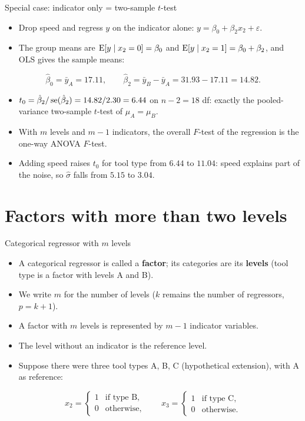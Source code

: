 \begin{frame}{Special case: indicator only = two-sample $t$-test}
    \begin{itemize}
        \item Drop speed and regress $y$ on the indicator alone: $y = \beta_0 + \beta_2 x_2 + \varepsilon$.
        \item The group means are $\operatorname{E}[y \mid x_2 = 0] = \beta_0$ and $\operatorname{E}[y \mid x_2 = 1] = \beta_0 + \beta_2$, and OLS gives the sample means:
    \end{itemize}
    \[
        \hat{\beta}_0 = \bar{y}_A = 17.11, \qquad \hat{\beta}_2 = \bar{y}_B - \bar{y}_A = 31.93 - 17.11 = 14.82 .
    \]
    \begin{itemize}
        \item $t_0 = \hat{\beta}_2 / \operatorname{se}(\hat{\beta}_2) = 14.82 / 2.30 = 6.44$ on $n - 2 = 18$ df: exactly the pooled-variance two-sample $t$-test of $\mu_A = \mu_B$.
        \item With $m$ levels and $m - 1$ indicators, the overall $F$-test of the regression is the one-way ANOVA $F$-test.
        \item Adding speed raises $t_0$ for tool type from $6.44$ to $11.04$: speed explains part of the noise, so $\hat{\sigma}$ falls from $5.15$ to $3.04$.
    \end{itemize}
\end{frame}


\section{Factors with more than two levels}


\begin{frame}{Categorical regressor with $m$ levels}
    \begin{itemize}
        \item A categorical regressor is called a \textbf{factor}; its categories are its \textbf{levels} (tool type is a factor with levels A and B).
        \item We write $m$ for the number of levels ($k$ remains the number of regressors, $p = k + 1$).
        \item A factor with $m$ levels is represented by $m-1$ indicator variables.
        \item The level without an indicator is the reference level.
        \item Suppose there were three tool types A, B, C (hypothetical extension), with A as reference:
    \end{itemize}
    \[
        x_2 =
        \begin{cases}
            1 & \text{if type B},\\
            0 & \text{otherwise},
        \end{cases}
        \qquad
        x_3 =
        \begin{cases}
            1 & \text{if type C},\\
            0 & \text{otherwise}.
        \end{cases}
    \]
\end{frame}


